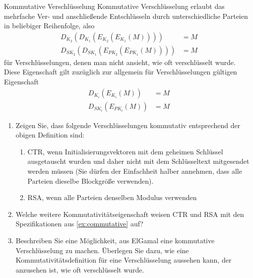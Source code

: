 \documentclass{article}
\begin{document}
\setcounter{subsection}{110}
\begin{exercise}{Kommutative Verschlüsselung}
  Kommutative Verschlüsselung erlaubt das mehrfache Ver- und anschließende Entschlüsseln durch unterschiedliche Parteien in beliebiger Reihenfolge, also
  \begin{align*}
    D_{K_2}(D_{K_1}(E_{K_2}(E_{K_1}(M)))) &= M\\
    D_{SK_2}(D_{SK_1}(E_{PK_2}(E_{PK_1}(M)))) &= M
  \end{align*}
  für Verschlüsselungen, denen man nicht ansieht, wie oft verschlüsselt wurde. Diese Eigenschaft gilt zuzüglich zur allgemein für Verschlüsselungen gültigen Eigenschaft
  \begin{align*}
    D_{K_i}(E_{K_i}(M)) &= M\\
    D_{SK_i}(E_{PK_i}(M)) &= M
  \end{align*}
  \begin{enumerate}
    \item\label{ex:commutative} Zeigen Sie, dass folgende Verschlüsselungen kommutativ entsprechend der obigen Definition sind:
      \begin{enumerate}
        \item CTR, wenn Initialisierungsvektoren mit dem geheimen Schlüssel ausgetauscht wurden und daher nicht mit dem Schlüsseltext mitgesendet werden müssen (Sie dürfen der Einfachheit halber annehmen, dass alle Parteien dieselbe Blockgröße verwenden).
        \item RSA, wenn alle Parteien denselben Modulus verwenden
      \end{enumerate}
    \item Welche weitere Kommutativitätseigenschaft weisen CTR und RSA mit den Spezifikationen aus \ref{ex:commutative} auf?
    \item Beschreiben Sie eine Möglichkeit, aus ElGamal eine kommutative Verschlüsselung zu machen. Überlegen Sie dazu, wie eine Kommutativitätsdefinition für eine Verschlüsselung aussehen kann, der anzusehen ist, wie oft verschlüsselt wurde.
  \end{enumerate}


\end{exercise}
\end{document}
